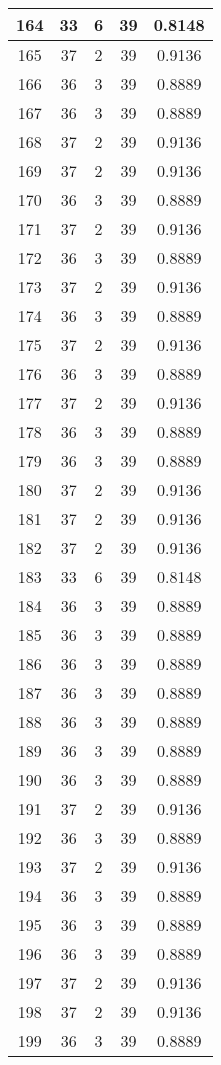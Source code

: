 \documentclass[letterpaper, 12pt]{article}
\begin{document}
\begin{longtable}{|c|c|c|c|c|}
\hline
164 & 33 & 6 & 39 & 0.8148 \\
\hline
165 & 37 & 2 & 39 & 0.9136 \\
\hline
166 & 36 & 3 & 39 & 0.8889 \\
\hline
167 & 36 & 3 & 39 & 0.8889 \\
\hline
168 & 37 & 2 & 39 & 0.9136 \\
\hline
169 & 37 & 2 & 39 & 0.9136 \\
\hline
170 & 36 & 3 & 39 & 0.8889 \\
\hline
171 & 37 & 2 & 39 & 0.9136 \\
\hline
172 & 36 & 3 & 39 & 0.8889 \\
\hline
173 & 37 & 2 & 39 & 0.9136 \\
\hline
174 & 36 & 3 & 39 & 0.8889 \\
\hline
175 & 37 & 2 & 39 & 0.9136 \\
\hline
176 & 36 & 3 & 39 & 0.8889 \\
\hline
177 & 37 & 2 & 39 & 0.9136 \\
\hline
178 & 36 & 3 & 39 & 0.8889 \\
\hline
179 & 36 & 3 & 39 & 0.8889 \\
\hline
180 & 37 & 2 & 39 & 0.9136 \\
\hline
181 & 37 & 2 & 39 & 0.9136 \\
\hline
182 & 37 & 2 & 39 & 0.9136 \\
\hline
183 & 33 & 6 & 39 & 0.8148 \\
\hline
184 & 36 & 3 & 39 & 0.8889 \\
\hline
185 & 36 & 3 & 39 & 0.8889 \\
\hline
186 & 36 & 3 & 39 & 0.8889 \\
\hline
187 & 36 & 3 & 39 & 0.8889 \\
\hline
188 & 36 & 3 & 39 & 0.8889 \\
\hline
189 & 36 & 3 & 39 & 0.8889 \\
\hline
190 & 36 & 3 & 39 & 0.8889 \\
\hline
191 & 37 & 2 & 39 & 0.9136 \\
\hline
192 & 36 & 3 & 39 & 0.8889 \\
\hline
193 & 37 & 2 & 39 & 0.9136 \\
\hline
194 & 36 & 3 & 39 & 0.8889 \\
\hline
195 & 36 & 3 & 39 & 0.8889 \\
\hline
196 & 36 & 3 & 39 & 0.8889 \\
\hline
197 & 37 & 2 & 39 & 0.9136 \\
\hline
198 & 37 & 2 & 39 & 0.9136 \\
\hline
199 & 36 & 3 & 39 & 0.8889 \\
\hline
\end{longtable}
\end{document}
